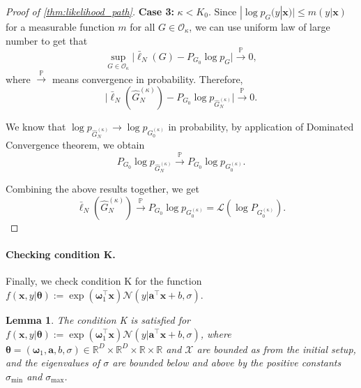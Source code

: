 \documentclass[twoside]{article}
\theoremstyle{plain}
\newtheorem{lemma}{Lemma}
\theoremstyle{definition}
\theoremstyle{plain}
\def\vtheta{{\bm{\theta}}}
\def\vomega{{\bm{\omega}}}
\def\va{{\bm{a}}}
\def\vx{{\bm{x}}}
\newcommand{\R}{\mathbb{R}}
\newcommand{\cL}{\mathcal{L}}
\newcommand{\cX}{\mathcal{X}}
\begin{document}
\begin{proof}[Proof of \cref{thm:likelihood_path}]
    \textbf{Case 3:} $\kappa < K_0$. Since $|\log p_G(y | \vx)| \leq m(y | \vx)$ for a measurable function $m$ for all $G \in \mathcal{O}_\kappa$, we can use uniform law of large number to get that
\[
\sup_{G \in \mathcal{O}_\kappa} \big| \bar{\ell}_N(G) - P_{G_0} \log p_G \big| 
\overset{\mathbb{P}}{\longrightarrow} 0,
\]
where $\overset{\mathbb{P}}{\longrightarrow}$ means convergence in probability. Therefore,
\[
\big| \bar{\ell}_N(\widehat{G}_N^{(\kappa)}) - P_{G_0} \log p_{\widehat{G}_N^{(\kappa)}} \big|
\overset{\mathbb{P}}{\longrightarrow} 0.
\]

We know that $\log p_{\widehat{G}_N^{(\kappa)}} \to \log p_{G_0^{(\kappa)}}$ in probability, by application of Dominated Convergence theorem, we obtain
\[
P_{G_0} \log p_{\widehat{G}_N^{(\kappa)}} 
\overset{\mathbb{P}}{\longrightarrow} 
P_{G_0} \log p_{G_0^{(\kappa)}}.
\]

Combining the above results together, we get
\[
\bar{\ell}_N(\widehat{G}_N^{(\kappa)}) 
\overset{\mathbb{P}}{\longrightarrow} 
P_{G_0} \log p_{G_0^{(\kappa)}} 
= \cL(\log P_{G_0^{(\kappa)}}).
\]
\end{proof}

\paragraph{Checking condition K.} 
Finally, we check condition K for the function $f(\vx, y | \vtheta)
:= \exp \left(\vomega_{1}^{\top} \vx\right) \mathcal{N}\left(y | \va^{\top} \vx + b, \sigma\right)$.

\begin{lemma}\label{lem:checking_condition_K}
    The condition K is satisfied for $f(\vx, y | \vtheta)
:= \exp \left(\vomega_{1}^{\top} \vx\right) \mathcal{N}\left(y | \va^{\top} \vx + b, \sigma\right)$, where $\vtheta = (\vomega_{1}, \va, b, \sigma) \in \R^D \times \R^D \times \R \times \R$ and $\cX$ are bounded as from the initial setup, and the eigenvalues of $\sigma$ are bounded below and above by the positive constants $\sigma_{\min }$ and $\sigma_{\max }$.
\end{lemma}
\end{document}
